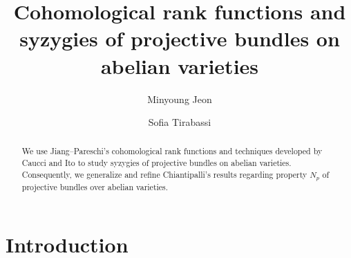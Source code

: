 \documentclass[11pt,letter]{amsart}
\numberwithin{equation}{section}
\begin{document}
	\title[Syzygies of Projective Bundles]{Cohomological rank functions and syzygies of projective bundles on abelian varieties}
	\author{Minyoung Jeon}
	  \address{Department of Mathematics\\University of Georgia, Athens GA 30602, USA}
  \author{Sofia Tirabassi}
  \address{Department of Mathematics\\ Stockholm University, Albano campus Hus 1, Stockholm, Sweden}



\clearpage\maketitle 
\begin{abstract}
We use Jiang--Pareschi's cohomological rank functions and techniques developed by Caucci and Ito to study syzygies of projective bundles on abelian varieties. Consequently, we generalize and refine Chiantipalli's results regarding property $N_p$ of projective bundles over abelian varieties.


\end{abstract}

\section{Introduction}
\end{document}

